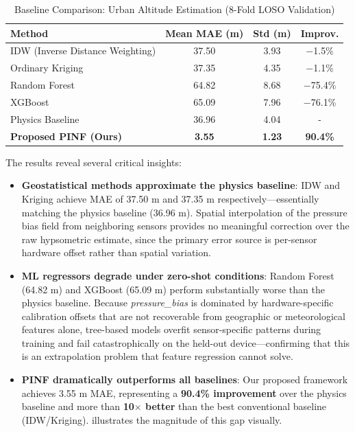 \begin{table}[htbp]
\caption{Baseline Comparison: Urban Altitude Estimation (8-Fold LOSO Validation)}
\label{tab:baseline_comparison}
\centering
\begin{tabular}{lccc}
\toprule
\textbf{Method} & \textbf{Mean MAE (m)} & \textbf{Std (m)} & \textbf{Improv.} \\
\midrule
IDW (Inverse Distance Weighting) & 37.50 & 3.93 & $-$1.5\% \\
Ordinary Kriging & 37.35 & 4.35 & $-$1.1\% \\
Random Forest & 64.82 & 8.68 & $-$75.4\% \\
XGBoost & 65.09 & 7.96 & $-$76.1\% \\
\midrule
Physics Baseline & 36.96 & 4.04 & - \\
\midrule
\textbf{Proposed PINF (Ours)} & \textbf{3.55} & \textbf{1.23} & \textbf{90.4\%} \\
\bottomrule
\end{tabular}
\end{table}

The results reveal several critical insights:

\begin{itemize}
    \item \textbf{Geostatistical methods approximate the physics baseline}: IDW and Kriging achieve MAE of 37.50 m and 37.35 m respectively---essentially matching the physics baseline (36.96 m). Spatial interpolation of the pressure bias field from neighboring sensors provides no meaningful correction over the raw hypsometric estimate, since the primary error source is per-sensor hardware offset rather than spatial variation.

    \item \textbf{ML regressors degrade under zero-shot conditions}: Random Forest (64.82 m) and XGBoost (65.09 m) perform substantially worse than the physics baseline. Because \emph{pressure\_bias} is dominated by hardware-specific calibration offsets that are not recoverable from geographic or meteorological features alone, tree-based models overfit sensor-specific patterns during training and fail catastrophically on the held-out device---confirming that this is an extrapolation problem that feature regression cannot solve.

    \item \textbf{PINF dramatically outperforms all baselines}: Our proposed framework achieves 3.55 m MAE, representing a \textbf{90.4\% improvement} over the physics baseline and more than \textbf{10$\times$ better} than the best conventional baseline (IDW/Kriging).  illustrates the magnitude of this gap visually.
\end{itemize}

